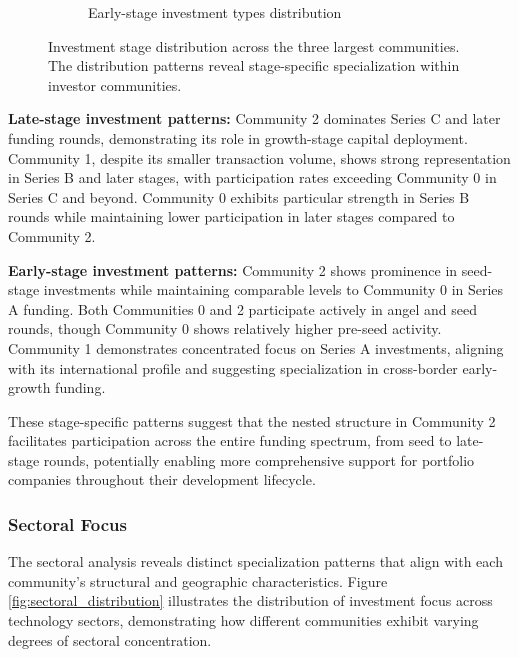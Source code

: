 \begin{figure}[htbp]
\begin{subfigure}{0.5\textwidth}
    \caption{Early-stage investment types distribution}
    \label{fig:early_stage_types}
\end{subfigure}
\caption{Investment stage distribution across the three largest communities. The distribution patterns reveal stage-specific specialization within investor communities.}
\label{fig:investment_stage_distribution}
\end{figure}

\textbf{Late-stage investment patterns:} Community 2 dominates Series C and later funding rounds, demonstrating its role in growth-stage capital deployment. Community 1, despite its smaller transaction volume, shows strong representation in Series B and later stages, with participation rates exceeding Community 0 in Series C and beyond. Community 0 exhibits particular strength in Series B rounds while maintaining lower participation in later stages compared to Community 2.

\textbf{Early-stage investment patterns:} Community 2 shows prominence in seed-stage investments while maintaining comparable levels to Community 0 in Series A funding. Both Communities 0 and 2 participate actively in angel and seed rounds, though Community 0 shows relatively higher pre-seed activity. Community 1 demonstrates concentrated focus on Series A investments, aligning with its international profile and suggesting specialization in cross-border early-growth funding.

These stage-specific patterns suggest that the nested structure in Community 2 facilitates participation across the entire funding spectrum, from seed to late-stage rounds, potentially enabling more comprehensive support for portfolio companies throughout their development lifecycle.

\subsubsection{Sectoral Focus}

The sectoral analysis reveals distinct specialization patterns that align with each community's structural and geographic characteristics. Figure \ref{fig:sectoral_distribution} illustrates the distribution of investment focus across technology sectors, demonstrating how different communities exhibit varying degrees of sectoral concentration.

